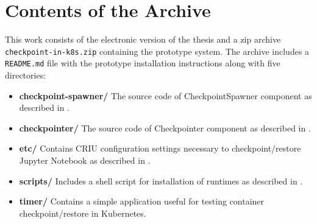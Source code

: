 \documentclass[
  digital,     %
  oneside,     %
  nosansbold,  %
  nocolorbold, %
  lof,         %
  nolot,         %
]{fithesis4}
\begin{document}
\appendix %
\chapter{Contents of the Archive}
\label{apendix}
This work consists of the electronic version of the thesis and a zip
archive \texttt{checkpoint-in-k8s.zip} containing the prototype system. The archive includes a \texttt{README.md} file with the prototype installation instructions along with five directories:
\begin{itemize}
    \item \textbf{checkpoint-spawner/} The source code of CheckpointSpawner component as described in .
    \item \textbf{checkpointer/} The source code of Checkpointer component as described in .
    \item \textbf{etc/} Contains CRIU configuration settings necessary to checkpoint/restore Jupyter Notebook as described in .
    \item \textbf{scripts/} Includes a shell script for installation of runtimes as described in .
    \item \textbf{timer/} Contains a simple application useful for testing container checkpoint/restore in Kubernetes.
\end{itemize}
\end{document}
